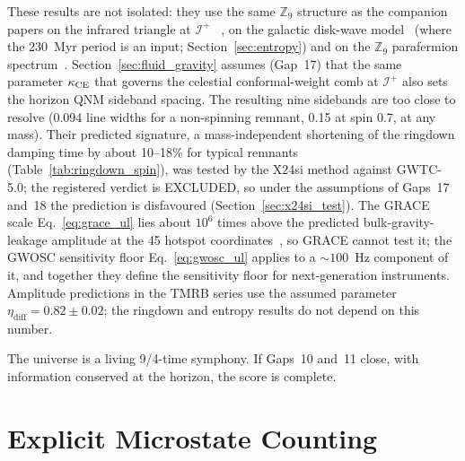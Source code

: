 \documentclass[11pt,a4paper]{article}
\begin{document}
These results are not isolated: they use the same $\mathbb{Z}_9$ structure as the companion papers on the infrared triangle at $\mathscr{I}^+$
~\cite{BresslerCH2026,BresslerMellin2026}, on the galactic disk-wave model~\cite{BresslerGP2026} (where the 230~Myr period is an input; Section~\ref{sec:entropy}) and on the $\mathbb{Z}_9$ parafermion
spectrum~\cite{BresslerCH2026}.  Section~\ref{sec:fluid_gravity} assumes (Gap~17) that the same parameter $\kappa_{\rm CE}$
that governs the celestial conformal-weight comb at $\mathscr{I}^+$ also sets
the horizon QNM sideband spacing.  The resulting nine sidebands are too close to
resolve (0.094 line widths for a non-spinning remnant, 0.15 at spin 0.7, at any mass). Their predicted signature, a
mass-independent shortening of the ringdown damping time by about 10--18\% for typical
remnants (Table~\ref{tab:ringdown_spin}), was tested by the X24si method against
GWTC-5.0; the registered verdict is EXCLUDED, so under the assumptions of Gaps~17 and~18 the prediction is disfavoured
(Section~\ref{sec:x24si_test}).  The GRACE scale Eq.~\eqref{eq:grace_ul} lies about $10^{6}$ times above the
predicted bulk-gravity-leakage amplitude at the 45 hotspot
coordinates~\cite{BresslerBGL2026}, so GRACE cannot test it; the GWOSC sensitivity floor Eq.~\eqref{eq:gwosc_ul} applies to
a $\sim 100$~Hz component of it, and together they define the sensitivity floor for
next-generation instruments.  Amplitude predictions in the TMRB series use the assumed parameter $\eta_{\mathrm{diff}} = 0.82\pm0.02$; the ringdown and entropy results do not depend on this number.

The universe is a living 9/4-time symphony.  If Gaps~10 and~11 close, with
information conserved at the horizon, the score is complete.

\appendix

\section{Explicit Microstate Counting}
\label{app:microstate}
\end{document}
